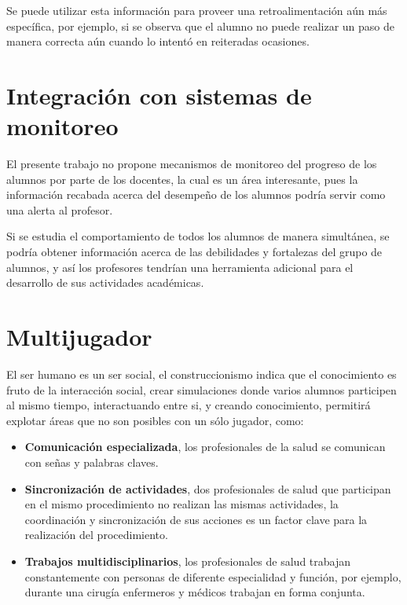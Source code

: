 Se puede utilizar esta información para proveer una retroalimentación aún más
específica, por ejemplo, si se observa que el alumno no puede realizar un paso
de manera correcta aún cuando lo intentó en reiteradas ocasiones.

\section{Integración con sistemas de monitoreo}

El presente trabajo no propone mecanismos de monitoreo del progreso de los
alumnos por parte de los docentes, la cual es un área interesante, pues la
información recabada acerca del desempeño de los alumnos podría servir como una
alerta al profesor.

Si se estudia el comportamiento de todos los alumnos de manera simultánea, se
podría obtener información acerca de las debilidades y fortalezas del grupo de
alumnos, y así los profesores tendrían una herramienta adicional para el
desarrollo de sus actividades académicas.

\section{Multijugador}

El ser humano es un ser social, el construccionismo indica que el conocimiento
es fruto de la interacción social, crear simulaciones donde varios alumnos
participen al mismo tiempo, interactuando entre si, y creando conocimiento,
permitirá explotar áreas que no son posibles con un sólo jugador, como:

\begin{itemize}
    \item \textbf{Comunicación especializada}, los profesionales de la salud se
        comunican con señas y palabras claves.
    \item \textbf{Sincronización de actividades}, dos profesionales de salud que
        participan en el mismo procedimiento no realizan las mismas actividades,
        la coordinación y sincronización de sus acciones es un factor clave para
        la realización del procedimiento.
    \item \textbf{Trabajos multidisciplinarios}, los profesionales de salud trabajan
        constantemente con personas de diferente especialidad y función, por
        ejemplo, durante una cirugía enfermeros y médicos trabajan en forma
        conjunta.
\end{itemize}


